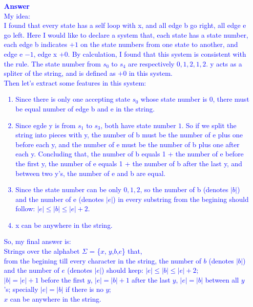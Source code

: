 \documentclass[10pt]{article}
\begin{document}
\begin{enumerate}
          \textcolor{blue}{
              \textbf{Answer}\\
              My idea:\\
              I found that every state has a self loop with x, and all edge b go right, all edge e go left.
              Here I would like to declare a system that, each state has a state number, each edge b indicates $+1$ on the state numbers from one state to another, and edge e $-1$, edge x $+0$.
              By calculation, I found that this system is consistent with the rule. The state number from $s_0$ to $s_4$ are respectively $0,1,2,1,2$. y acts as a spliter of the string, and is defined as $+0$ in this system.\\
              Then let's extract some features in this system:
              \begin{enumerate}
                  \item Since there is only one accepting state $s_0$ whose state number is 0, there must be equal number of edge b and e in the string.
                  \item Since egde y is from $s_1$ to $s_3$, both have state number $1$. So if we split the string into pieces with y, the number of b must be the number of e plus one before each y, and the number of e must be the number of b plus one after each y. Concluding that, the number of b equals 1 + the number of e before the first y, the number of e equals 1 + the number of b after the last y, and between two y's, the number of e and b are equal.
                  \item Since the state number can be only $0,1,2$, so the number of b (denotes $|b|$) and the number of e (denotes $|e|$) in every substring from the begining should follow: $|e|\leq |b|\leq |e|+2$.
                  \item x can be anywhere in the string.
              \end{enumerate}
              So, my final answer is:\\
              Strings over the alphabet $\Sigma$ = \{$x$, $y$,$b$,$e$\} that,\\
              from the begining till every character in the string, the number of $b$ (denotes $|b|$) and the number of $e$ (denotes $|e|$) should keep: $|e|\leq |b|\leq |e|+2$;\\
              $|b|=|e|+1$ before the first $y$, $|e|=|b|+1$ after the last $y$, $|e|=|b|$ between all $y$'s; specially $|e|=|b|$ if there is no $y$;\\
              $x$ can be anywhere in the string.
          }

\end{enumerate}
\end{document}
